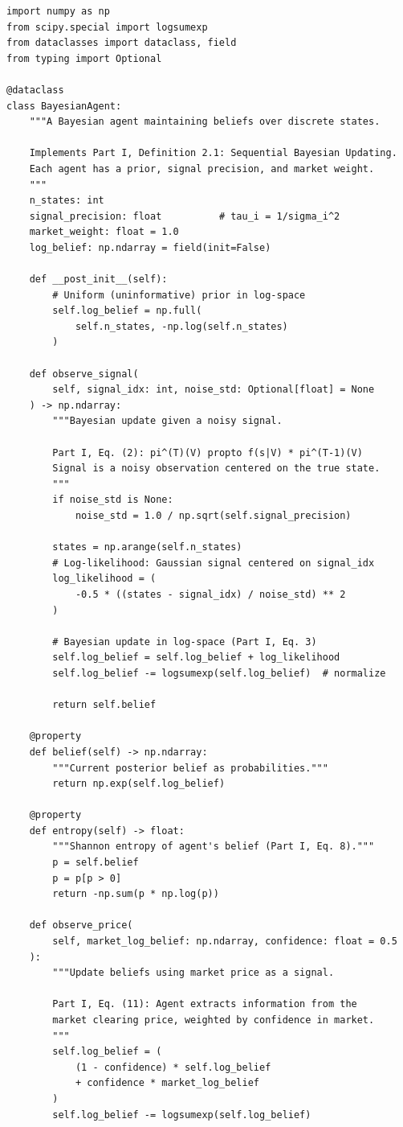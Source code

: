 \documentclass[12pt,a4paper]{article}
\theoremstyle{definition}
\begin{document}
\begin{lstlisting}[caption={Bayesian Agent --- Sequential posterior updating (Part~I, Eq.~2)},label=lst:agent]
import numpy as np
from scipy.special import logsumexp
from dataclasses import dataclass, field
from typing import Optional

@dataclass
class BayesianAgent:
    """A Bayesian agent maintaining beliefs over discrete states.
    
    Implements Part I, Definition 2.1: Sequential Bayesian Updating.
    Each agent has a prior, signal precision, and market weight.
    """
    n_states: int
    signal_precision: float          # tau_i = 1/sigma_i^2
    market_weight: float = 1.0
    log_belief: np.ndarray = field(init=False)
    
    def __post_init__(self):
        # Uniform (uninformative) prior in log-space
        self.log_belief = np.full(
            self.n_states, -np.log(self.n_states)
        )
    
    def observe_signal(
        self, signal_idx: int, noise_std: Optional[float] = None
    ) -> np.ndarray:
        """Bayesian update given a noisy signal.
        
        Part I, Eq. (2): pi^(T)(V) propto f(s|V) * pi^(T-1)(V)
        Signal is a noisy observation centered on the true state.
        """
        if noise_std is None:
            noise_std = 1.0 / np.sqrt(self.signal_precision)
        
        states = np.arange(self.n_states)
        # Log-likelihood: Gaussian signal centered on signal_idx
        log_likelihood = (
            -0.5 * ((states - signal_idx) / noise_std) ** 2
        )
        
        # Bayesian update in log-space (Part I, Eq. 3)
        self.log_belief = self.log_belief + log_likelihood
        self.log_belief -= logsumexp(self.log_belief)  # normalize
        
        return self.belief
    
    @property
    def belief(self) -> np.ndarray:
        """Current posterior belief as probabilities."""
        return np.exp(self.log_belief)
    
    @property
    def entropy(self) -> float:
        """Shannon entropy of agent's belief (Part I, Eq. 8)."""
        p = self.belief
        p = p[p > 0]
        return -np.sum(p * np.log(p))
    
    def observe_price(
        self, market_log_belief: np.ndarray, confidence: float = 0.5
    ):
        """Update beliefs using market price as a signal.
        
        Part I, Eq. (11): Agent extracts information from the
        market clearing price, weighted by confidence in market.
        """
        self.log_belief = (
            (1 - confidence) * self.log_belief
            + confidence * market_log_belief
        )
        self.log_belief -= logsumexp(self.log_belief)
\end{lstlisting}
\end{document}

